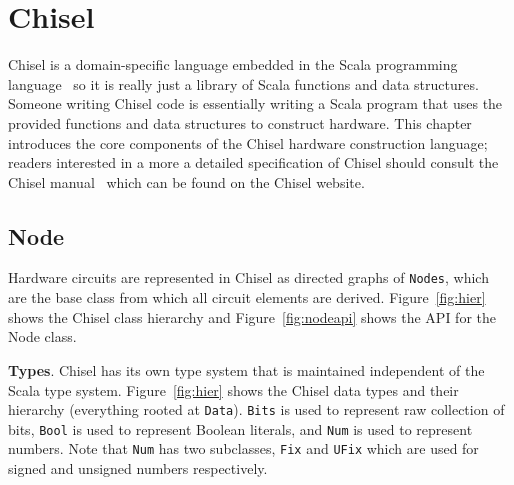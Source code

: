 \section{Chisel}
\label{sec:chisel}
Chisel is a domain-specific language embedded in the Scala
programming language~\cite{scala} so it is really just a library of Scala functions
and data structures. Someone writing Chisel code is essentially writing a Scala
program that uses the provided functions and data structures to
construct hardware. This chapter introduces the core
components of the Chisel hardware construction language; readers
interested in a more a detailed specification of Chisel should consult
the Chisel manual~\cite{chisel:man} which can be found on the Chisel website. 

\subsection{Node}
Hardware circuits are represented in Chisel as directed graphs of
{\tt Nodes}, which are the base class from which all circuit elements are
derived. Figure~\ref{fig:hier} shows the Chisel class
hierarchy and Figure~\ref{fig:nodeapi} shows the API for the Node class.

{\bf Types}. Chisel has its own type system that is maintained
independent of the Scala type system. Figure~\ref{fig:hier} shows the
Chisel data types and their hierarchy (everything rooted at
{\tt Data}). {\tt Bits} is used to represent raw collection of bits,
{\tt Bool} is used to represent Boolean literals, and {\tt Num} is
used to represent numbers. Note that {\tt Num} has two subclasses,
{\tt Fix} and {\tt UFix} which are used for signed and unsigned
numbers respectively.

